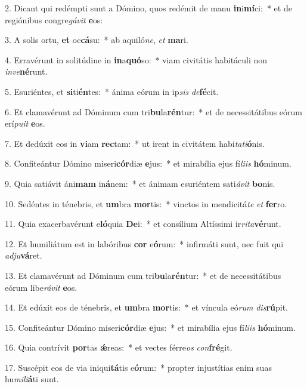 2. Dicant qui redémpti sunt a Dómino, quos redémit de manu \textbf{in}i\textbf{mí}ci:~*  et de regiónibus congre\textit{gá}\textit{vit} \textbf{e}os:\

3. A solis ortu, \textbf{et} oc\textbf{cá}su:~*  ab aquiló\textit{ne}, \textit{et} \textbf{ma}ri.\

4. Erravérunt in solitúdine in \textbf{in}a\textbf{quó}so:~*  viam civitátis habitáculi non \textit{in}\textit{ve}\textbf{né}runt.\

5. Esuriéntes, et \textbf{si}ti\textbf{én}tes:~*  ánima eórum in ip\textit{sis} \textit{de}\textbf{fé}cit.\

6. Et clamavérunt ad Dóminum cum tri\textbf{bu}la\textbf{rén}tur:~*  et de necessitátibus eórum erí\textit{pu}\textit{it} \textbf{e}os.\

7. Et dedúxit eos in \textbf{vi}am \textbf{rec}tam:~*  ut irent in civitátem habi\textit{ta}\textit{ti}\textbf{ó}nis.\

8. Confiteántur Dómino miseri\textbf{cór}diæ \textbf{e}jus:~*  et mirabília ejus fí\textit{li}\textit{is} \textbf{hó}minum.\

9. Quia satiávit áni\textbf{mam} in\textbf{á}nem:~*  et ánimam esuriéntem sati\textit{á}\textit{vit} \textbf{bo}nis.\

10. Sedéntes in ténebris, et \textbf{um}bra \textbf{mor}tis:~*  vinctos in mendicitá\textit{te} \textit{et} \textbf{fer}ro.\

11. Quia exacerbavérunt e\textbf{ló}quia \textbf{De}i:~*  et consílium Altíssimi ir\textit{ri}\textit{ta}\textbf{vé}runt.\

12. Et humiliátum est in labóribus \textbf{cor} e\textbf{ó}rum:~*  infirmáti sunt, nec fuit qui \textit{ad}\textit{ju}\textbf{vá}ret.\

13. Et clamavérunt ad Dóminum cum tri\textbf{bu}la\textbf{rén}tur:~*  et de necessitátibus eórum libe\textit{rá}\textit{vit} \textbf{e}os.\

14. Et edúxit eos de ténebris, et \textbf{um}bra \textbf{mor}tis:~*  et víncula eó\textit{rum} \textit{dis}\textbf{rú}pit.\

15. Confiteántur Dómino miseri\textbf{cór}diæ \textbf{e}jus:~*  et mirabília ejus fí\textit{li}\textit{is} \textbf{hó}minum.\

16. Quia contrívit \textbf{por}tas \textbf{ǽ}reas:~*  et vectes férre\textit{os} \textit{con}\textbf{fré}git.\

17. Suscépit eos de via iniqui\textbf{tá}tis e\textbf{ó}rum:~*  propter injustítias enim suas hu\textit{mi}\textit{li}\textbf{á}ti sunt.\

